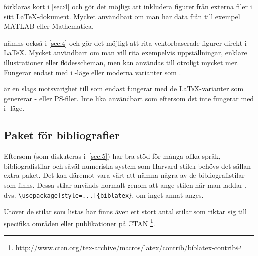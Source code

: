 \documentclass[10pt,../../a4.tex]{subfiles}
\begin{document}
\begin{description}
	\item[\pack{graphicx}]
	förklaras kort i \cref{sec:4} och gör det möjligt att inkludera
	figurer från externa filer i sitt \LaTeX-dokument. Mycket användbart
	om man har data från till exempel MATLAB eller Mathematica.
	
	\item[\pack{tikz}]
	nämns också i \cref{sec:4} och gör det möjligt att rita
	vektorbaserade figurer direkt i \LaTeX. Mycket användbart om man
	vill rita exempelvis uppställningar, enklare illustrationer eller 
	flödesscheman, men kan användas till otroligt mycket mer. Fungerar
	endast med \pdfLaTeX{} i \PDF-läge eller moderna varianter som
	\XeTeX.

	\item[\pack{pstricks}]
	är en slags motsvarighet till  som endast fungerar med de
	\LaTeX-varianter som genererar \DVI- eller \textsc{PS}-filer. Inte
	lika användbart som  eftersom det inte fungerar med 
	\pdfLaTeX{} i \PDF-läge.
\end{description}

\subsection{Paket för bibliografier}
Eftersom  (som diskuteras i~\cref{sec:5}) har bra stöd
för många olika språk, bibliografistilar och såväl numeriska system som
Harvard-stilen behövs det sällan extra paket. Det kan däremot vara värt
att nämna några av de bibliografistilar som finns. Dessa stilar används
normalt genom att ange stilen när man laddar , dvs.
\verb|\usepackage[style=...]{biblatex}|,
om inget annat anges.

Utöver de stilar som listas här finns även ett stort antal stilar som
riktar sig till specifika områden eller publikationer på CTAN%
\footnote{\url{http://www.ctan.org/tex-archive/macros/latex/contrib/biblatex-contrib}}.
\end{document}
